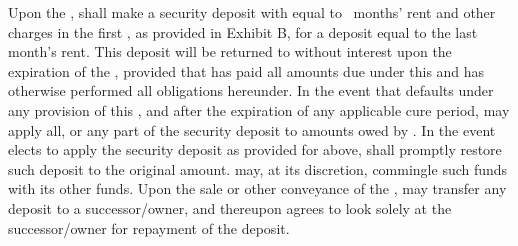 Upon the \deliveryDate, \lessee shall make a security deposit with \lessor equal to \securityDepositMonthsText\ months' rent and other charges in the first \leaseYear, as provided in Exhibit B, for a deposit equal to the last month's rent. This deposit will be returned to \lessee without interest upon the expiration of the \termOfLease, provided that \lessee has paid all amounts due under this \lease and has otherwise performed all obligations hereunder. In the event that \lessee defaults under any provision of this \lease, and after the expiration of any applicable cure period, \lessor may apply all, or any part of the security deposit to amounts owed by \lessee. In the event \lessor elects to apply the security deposit as provided for above, \lessee shall promptly restore such deposit to the original amount. \lessor may, at its discretion, commingle such funds with its other funds. Upon the sale or other conveyance of the \building, \lessor may transfer any deposit to a successor/owner, and thereupon \lessee agrees to look solely at the successor/owner for repayment of the deposit.
